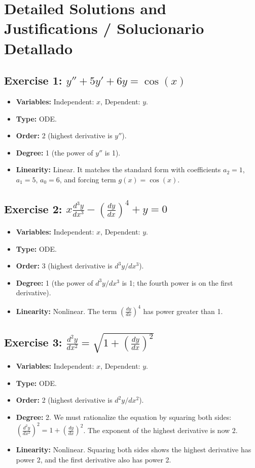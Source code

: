 \documentclass[11pt,letterpaper]{article}
\begin{document}
\newpage
\section{Detailed Solutions and Justifications / Solucionario Detallado}

\subsection*{Exercise 1: $y'' + 5y' + 6y = \cos(x)$}
\begin{itemize}
    \item \textbf{Variables:} Independent: $x$, Dependent: $y$.
    \item \textbf{Type:} ODE.
    \item \textbf{Order:} 2 (highest derivative is $y''$).
    \item \textbf{Degree:} 1 (the power of $y''$ is 1).
    \item \textbf{Linearity:} Linear. It matches the standard form with coefficients $a_2=1$, $a_1=5$, $a_0=6$, and forcing term $g(x)=\cos(x)$.
\end{itemize}

\subsection*{Exercise 2: $x \frac{d^3 y}{dx^3} - \left(\frac{dy}{dx}\right)^4 + y = 0$}
\begin{itemize}
    \item \textbf{Variables:} Independent: $x$, Dependent: $y$.
    \item \textbf{Type:} ODE.
    \item \textbf{Order:} 3 (highest derivative is $d^3y/dx^3$).
    \item \textbf{Degree:} 1 (the power of $d^3y/dx^3$ is 1; the fourth power is on the first derivative).
    \item \textbf{Linearity:} Nonlinear. The term $\left(\frac{dy}{dx}\right)^4$ has power greater than 1.
\end{itemize}

\subsection*{Exercise 3: $\frac{d^2 y}{dx^2} = \sqrt{1 + \left(\frac{dy}{dx}\right)^2}$}
\begin{itemize}
    \item \textbf{Variables:} Independent: $x$, Dependent: $y$.
    \item \textbf{Type:} ODE.
    \item \textbf{Order:} 2 (highest derivative is $d^2y/dx^2$).
    \item \textbf{Degree:} 2. We must rationalize the equation by squaring both sides: $\left(\frac{d^2 y}{dx^2}\right)^2 = 1 + \left(\frac{dy}{dx}\right)^2$. The exponent of the highest derivative is now 2.
    \item \textbf{Linearity:} Nonlinear. Squaring both sides shows the highest derivative has power 2, and the first derivative also has power 2.
\end{itemize}
\end{document}
